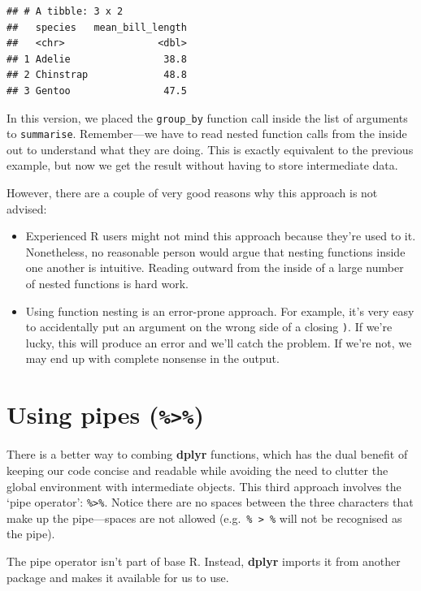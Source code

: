 \documentclass[
]{book}
\begin{document}
\begin{verbatim}
## # A tibble: 3 x 2
##   species   mean_bill_length
##   <chr>                <dbl>
## 1 Adelie                38.8
## 2 Chinstrap             48.8
## 3 Gentoo                47.5
\end{verbatim}

In this version, we placed the \texttt{group\_by} function call inside the list of arguments to \texttt{summarise}. Remember---we have to read nested function calls from the inside out to understand what they are doing. This is exactly equivalent to the previous example, but now we get the result without having to store intermediate data.

However, there are a couple of very good reasons why this approach is not advised:

\begin{itemize}
\item
  Experienced R users might not mind this approach because they're used to it. Nonetheless, no reasonable person would argue that nesting functions inside one another is intuitive. Reading outward from the inside of a large number of nested functions is hard work.
\item
  Using function nesting is an error-prone approach. For example, it's very easy to accidentally put an argument on the wrong side of a closing \texttt{)}. If we're lucky, this will produce an error and we'll catch the problem. If we're not, we may end up with complete nonsense in the output.
\end{itemize}

\hypertarget{using-pipes}{%
\section{\texorpdfstring{Using pipes (\texttt{\%\textgreater{}\%})}{Using pipes (\%\textgreater\%)}}\label{using-pipes}}

There is a better way to combing \textbf{dplyr} functions, which has the dual benefit of keeping our code concise and readable while avoiding the need to clutter the global environment with intermediate objects. This third approach involves the `pipe operator': \texttt{\%\textgreater{}\%}. Notice there are no spaces between the three characters that make up the pipe---spaces are not allowed (e.g.~\texttt{\%\ \textgreater{}\ \%} will not be recognised as the pipe).

The pipe operator isn't part of base R. Instead, \textbf{dplyr} imports it from another package and makes it available for us to use.
\end{document}
